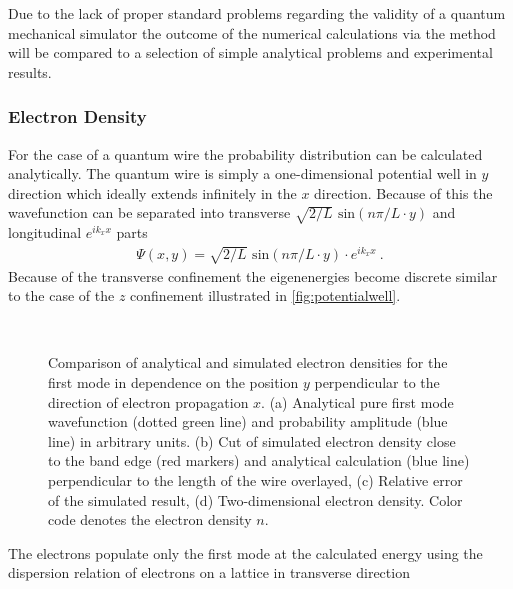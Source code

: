 Due to the lack of proper standard problems regarding the validity of a quantum mechanical simulator the outcome of the numerical calculations via the \gfnc{} method will be compared to a selection of simple analytical problems and experimental results.\par
\subsubsection{Electron Density}
For the case of a quantum wire the probability distribution can be calculated analytically. The quantum wire is simply a one-dimensional potential well in $y$ direction which ideally extends infinitely in the $x$ direction.
Because of this the wavefunction can be separated into transverse $\sqrt{2/L}\text{ sin}(n\pi/L \cdot y)$ and longitudinal $e^{ik_xx}$ parts
\begin{align}
\Psi(x,y) = \sqrt{2/L}\text{ sin}(n\pi/L \cdot y) \cdot e^{ik_xx}\ .
\end{align}
Because of the transverse confinement the eigenenergies become discrete similar to the case of the $z$ confinement illustrated in \cref{fig:potentialwell}.
\begin{figure}[h!]
  \begin{center}
 \qquad
    \\
    \qquad
    \caption{Comparison of analytical and simulated electron densities for the first mode in dependence on the position $y$ perpendicular to the direction of electron propagation $x$. (a) Analytical pure first mode wavefunction (dotted green line) and probability amplitude (blue line) in arbitrary units. (b) Cut of simulated electron density close to the band edge (red markers) and analytical calculation (blue line) perpendicular to the length of the wire overlayed, (c) Relative error of the simulated result, (d) Two-dimensional electron density. Color code denotes the electron density $n$. }\label{fig:mode1}
  \end{center}
\end{figure}
The electrons populate only the first mode at the calculated energy using the dispersion relation of electrons on a lattice in transverse direction
